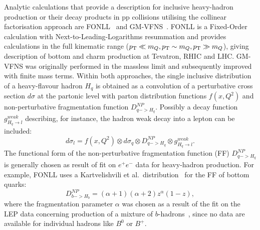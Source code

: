 Analytic calculations that provide a description for inclusive 
heavy-hadron production or their decay products
in pp collisions utilising the collinear factorisation approach 
are FONLL~\cite{Cacciari:1998it,Cacciari:2001td} 
and GM-VFNS~\cite{Kniehl:2004fy}. 
FONLL is a Fixed-Order calculation with Next-to-Leading-Logarithms 
resummation and provides calculations in the full kinematic range 
($p_{\rm T} \ll m_Q, p_{\rm T} \sim m_Q, p_{\rm T} \gg m_Q$),
giving description of bottom and charm production at Tevatron, RHIC and LHC. 
GM-VFNS was originally performed in the massless limit 
and subsequently improved with finite mass terms.
Within both approaches, the single inclusive distribution of a 
heavy-flavour hadron $H_q$ is obtained as a convolution of a
perturbative cross section $d\sigma$ at the partonic level with 
parton distribution functions $f(x, Q^2)$ and non-perturbative 
fragmentation function $D^{NP}_{q->H_q}$.
Possibly a decay function $g^{weak}_{H_q \rightarrow l}$ 
describing, for instance, the hadron weak decay into a lepton can be included:
\begin{equation}
d\sigma_l = f(x, Q^2) \otimes d\sigma_{q} \otimes D^{NP}_{q->H_q} \otimes g^{weak}_{H_q \rightarrow l}.
\end{equation}
The functional form of the non-perturbative fragmentation 
function (FF) $D^{NP}_{q->H_q}$ 
is generally chosen as result of fit on $e^+e^-$ data for 
heavy-hadron production. For example, FONLL uses
a Kartvelishvili et al.~distribution~\cite{Kartvelishvili:1977pi} 
for the FF of bottom quarks:
\begin{equation}
D^{NP}_{b->H_b}= (\alpha +1 )(\alpha +2)z^{\alpha} (1-z),
\end{equation}
where the fragmentation parameter $\alpha$ was chosen as a 
result of the fit on the LEP data concerning production
of a mixture of $b$-hadrons~\cite{Cacciari:2005uk,Heister:2001jg,Abbiendi:2002vt}, 
since no data are available for individual hadrons like $B^0$ or $B^+$.
